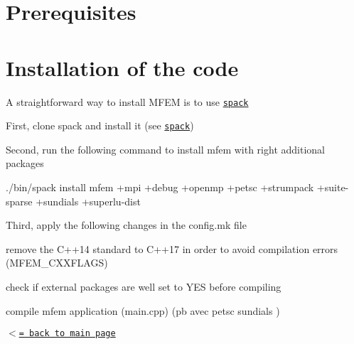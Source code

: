 \hypertarget{__install___prerequis}{}\section{Prerequisites}\label{__install___prerequis}
\hypertarget{__install___code}{}\section{Installation of the code}\label{__install___code}
A straightforward way to install M\+F\+EM is to use \href{https://spack.readthedocs.io/en/latest/getting_started.html}{\tt spack}


\begin{DoxyItemize}
\item First, clone spack and install it (see \href{https://spack.readthedocs.io/en/latest/getting_started.html}{\tt spack})
\item Second, run the following command to install mfem with right additional packages
\end{DoxyItemize}


\begin{DoxyCode}
./bin/spack install mfem +mpi  +debug +openmp +petsc +strumpack +suite-sparse +sundials +superlu-dist
\end{DoxyCode}

\begin{DoxyItemize}
\item Third, apply the following changes in the config.\+mk file
\begin{DoxyItemize}
\item remove the C++14 standard to C++17 in order to avoid compilation errors (M\+F\+E\+M\+\_\+\+C\+X\+X\+F\+L\+A\+GS)
\item check if external packages are well set to Y\+ES before compiling
\end{DoxyItemize}
\item compile mfem application (main.\+cpp) (pb avec petsc sundials )
\end{DoxyItemize}

\href{index.html}{\tt $<$= back to main page} 
